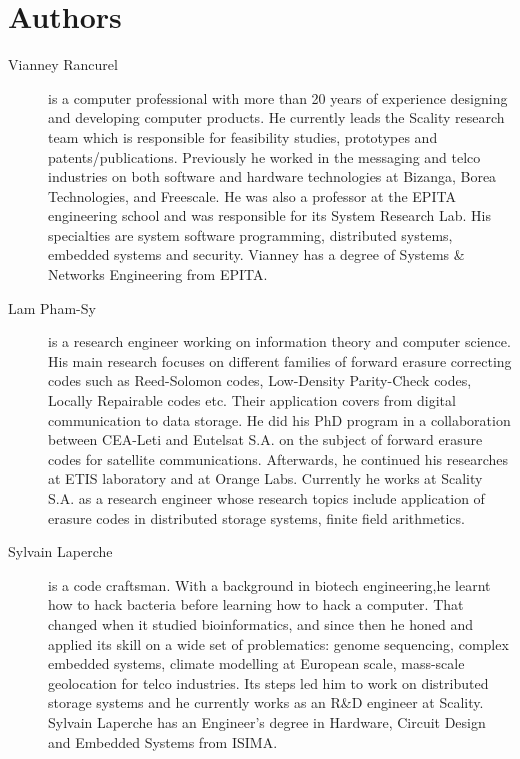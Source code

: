 \documentclass[oneside,9pt]{article}
\begin{document}




\section*{Authors}

\begin{description}

\item[Vianney Rancurel] is a computer professional with more than 20 years of experience designing and developing computer products. He currently leads the Scality research team which is responsible for feasibility studies, prototypes and patents/publications. Previously he worked in the messaging and telco industries on both software and hardware technologies at Bizanga, Borea Technologies, and Freescale. He was also a professor at the EPITA engineering school and was responsible for its System Research Lab. His specialties are system software programming, distributed systems, embedded systems and security. Vianney has a degree of Systems \& Networks Engineering from EPITA.

\item[Lam Pham-Sy] is a research engineer working on information theory and computer science. His main research focuses on different families of forward erasure correcting codes such as Reed-Solomon codes, Low-Density Parity-Check codes, Locally Repairable codes etc. Their application covers from digital communication to data storage. He did his PhD program in a collaboration between CEA-Leti and Eutelsat S.A. on the subject of forward erasure codes for satellite communications. Afterwards, he continued his researches at ETIS laboratory and at Orange Labs. Currently he works at Scality S.A. as a research engineer whose research topics include application of erasure codes in distributed storage systems, finite field arithmetics.

\item[Sylvain Laperche] is a code craftsman. With a background in biotech engineering,he learnt how to hack bacteria before learning how to hack a computer. That changed when it studied bioinformatics, and since then he honed and applied its skill on a wide set of problematics: genome sequencing, complex embedded systems, climate modelling at European scale, mass-scale geolocation for telco industries. Its steps led him to work on distributed storage systems and he currently works as an R\&D engineer at Scality.
Sylvain Laperche has an Engineer's degree in Hardware, Circuit Design and Embedded Systems from ISIMA.

\end{description}
\end{document}
